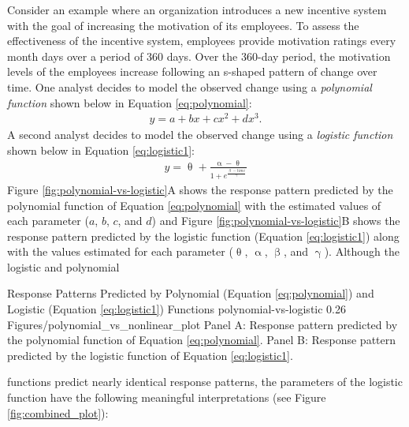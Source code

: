 \documentclass[
12pt, %
twoside,
english]{guelphthesis}
\begin{document}
Consider an example where an organization introduces a new incentive system with the goal of increasing the motivation of its employees. To assess the effectiveness of the incentive system, employees provide motivation ratings every month days over a period of 360 days. Over the 360-day period, the motivation levels of the employees increase following an s-shaped pattern of change over time. One analyst decides to model the observed change using a \emph{polynomial function} shown below in Equation \ref{eq:polynomial}:
\begin{align}
  y = \mathit{a} + \mathit{b}x + \mathit{c}x^2 + \mathit{d}x^3.
  \label{eq:polynomial}
\end{align}
\noindent A second analyst decides to model the observed change using a \emph{logistic function} shown below in Equation \ref{eq:logistic1}:
\begin{align}
  y = \uptheta + \frac{\upalpha - \uptheta}{1 + e^{\frac{\upbeta -time}{\upgamma}}}
  \label{eq:logistic1}
\end{align}
\noindent  Figure \ref{fig:polynomial-vs-logistic}A shows the response pattern predicted by the polynomial function of Equation \ref{eq:polynomial} with the estimated values of each parameter (\(a\), \(b\), \(c\), and \(d\)) and Figure \ref{fig:polynomial-vs-logistic}B shows the response pattern predicted by the logistic function (Equation \ref{eq:logistic1}) along with the values estimated for each parameter (\(\uptheta\), \(\upalpha\), \(\upbeta\), and \(\upgamma\)). Although the logistic and polynomial
\begin{apaFigure}
[portrait]
[samepage]
[0cm]
{Response Patterns Predicted by Polynomial (Equation \ref{eq:polynomial}) and Logistic (Equation \ref{eq:logistic1}) Functions}
{polynomial-vs-logistic}
{0.26}
{Figures/polynomial_vs_nonlinear_plot}
{Panel A: Response pattern predicted by the polynomial function of Equation \eqref{eq:polynomial}. Panel B: Response pattern predicted by the logistic function of Equation \eqref{eq:logistic1}.}
\end{apaFigure}
\noindent functions predict nearly identical response patterns, the parameters of the logistic function have the following meaningful interpretations (see Figure \ref{fig:combined_plot}):
\end{document}
